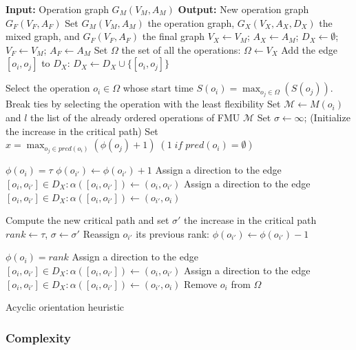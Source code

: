 \begin{algorithm}[htb]		
		\textbf{Input:} Operation graph $G_M(V_M,A_M)$\;
		\textbf{Output:} New operation graph $G_F(V_F,A_F)$\;
		Set $G_M(V_M,A_M)$ the operation graph, $G_X(V_X,A_X,D_X)$ the mixed graph, and $G_F(V_F,A_F)$ the final graph\;
		$V_X \leftarrow V_M$; $A_X \leftarrow A_M$; $D_X \leftarrow \emptyset$; $V_F \leftarrow V_M$; $A_F \leftarrow A_M$\;
		Set $\Omega$ the set of all the operations: $\Omega \leftarrow V_X$\;  
		{
				Add the edge $[o_i,o_j]$ to $D_X$: $D_X \leftarrow D_X \cup \{[o_i,o_j]\}$
		}
		\While{$\Omega \neq \emptyset$}
		{
			Select the operation $o_i \in \Omega$ whose start time $S(o_i) = \max_{o_j \in \Omega}(S(o_j))$. Break ties by selecting the operation with the least flexibility\;
			Set $\mathcal{M} \leftarrow M(o_i)$ and $l$ the list of the already ordered operations of FMU $\mathcal{M}$\;
			Set $\sigma \leftarrow \infty$; (Initialize the increase in the critical path)\;
			Set $x = \max_{o_j \in pred(o_i)}(\phi(o_j)+1)\; (1 \; if \; pred(o_i) = \emptyset)$\;
			{
				$\phi(o_i)=\tau$\;
				{
					$\phi(o_{i'}) \leftarrow \phi(o_{i'}) + 1$
				}
				{
					{
						Assign a direction to the edge $[o_i,o_{i'}] \in D_X: \alpha([o_i,o_{i'}]) \leftarrow (o_i,o_{i'})$
					}
					\lElse
					{
						Assign a direction to the edge $[o_i,o_{i'}] \in D_X: \alpha([o_i,o_{i'}]) \leftarrow (o_{i'},o_i)$
					}
				}
				
				Compute the new critical path and set $\sigma'$ the increase in the critical path\;
				{
					$rank \leftarrow \tau$,
					$\sigma \leftarrow \sigma'$
				}
				{
					Reassign $o_{i'}$ its previous rank: $\phi(o_{i'}) \leftarrow \phi(o_{i'})-1$
				}
			}
			$\phi(o_i)=rank$\;
			{
				{
					Assign a direction to the edge $[o_i,o_{i'}] \in D_X: \alpha([o_i,o_{i'}])\leftarrow (o_i,o_{i'})$
				}
				\lElse
				{
					Assign a direction to the edge $[o_i,o_{i'}] \in D_X: \alpha([o_i,o_{i'}])\leftarrow (o_{i'},o_i)$
				}
			}
			Remove $o_i$ from $\Omega$\;
		}
	\caption{Acyclic orientation heuristic}
	\label{algo:ao}
\end{algorithm}

\subsubsection{Complexity}

